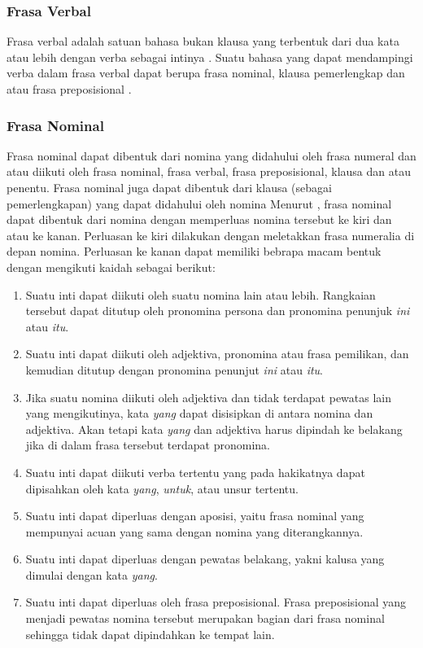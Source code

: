 \subsubsection{Frasa Verbal}
Frasa verbal adalah satuan bahasa bukan klausa yang terbentuk dari dua kata atau lebih dengan verba sebagai intinya \citep{alwi}. Suatu bahasa yang dapat mendampingi verba dalam frasa verbal dapat berupa frasa nominal, klausa pemerlengkap dan atau frasa preposisional \citep{lapoliwa}.

\subsubsection{Frasa Nominal}
Frasa nominal dapat dibentuk dari nomina yang didahului oleh frasa numeral dan atau diikuti oleh frasa nominal, frasa verbal, frasa preposisional, klausa dan atau penentu. Frasa nominal juga dapat dibentuk dari klausa (sebagai pemerlengkapan) yang dapat didahului oleh nomina \citep{lapoliwa}
Menurut \citet{alwi}, frasa nominal dapat dibentuk dari nomina dengan memperluas nomina tersebut ke kiri dan atau ke kanan. Perluasan ke kiri dilakukan dengan meletakkan frasa numeralia di depan nomina. Perluasan ke kanan dapat memiliki bebrapa macam bentuk dengan mengikuti kaidah sebagai berikut:
\begin{enumerate}
	\item Suatu inti dapat diikuti oleh suatu nomina lain atau lebih. Rangkaian tersebut dapat ditutup oleh pronomina persona dan pronomina penunjuk \emph{ini} atau \emph{itu}.
	
	\item Suatu inti dapat diikuti oleh adjektiva, pronomina atau frasa pemilikan, dan kemudian ditutup dengan pronomina penunjut \emph{ini} atau \emph{itu}.
	
	\item Jika suatu nomina diikuti oleh adjektiva dan tidak terdapat pewatas lain yang mengikutinya, kata \emph{yang} dapat disisipkan di antara nomina dan adjektiva. Akan tetapi kata \emph{yang} dan adjektiva harus dipindah ke belakang jika di dalam frasa tersebut terdapat pronomina.

	\item Suatu inti dapat diikuti verba tertentu yang pada hakikatnya dapat dipisahkan oleh kata \emph{yang}, \emph{untuk}, atau unsur tertentu.

	\item Suatu inti dapat diperluas dengan aposisi, yaitu frasa nominal yang mempunyai acuan yang sama dengan nomina yang diterangkannya.

	\item Suatu inti dapat diperluas dengan pewatas belakang, yakni kalusa yang dimulai dengan kata \emph{yang}.

	\item Suatu inti dapat diperluas oleh frasa preposisional. Frasa preposisional yang menjadi pewatas nomina tersebut merupakan bagian dari frasa nominal sehingga tidak dapat dipindahkan ke tempat lain. 
\end{enumerate}

